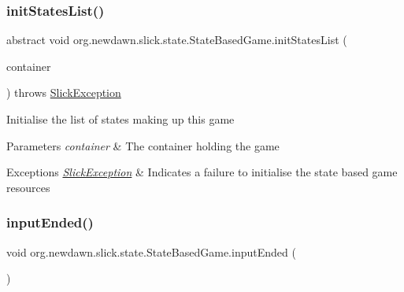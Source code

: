 \subsubsection{\texorpdfstring{init\+States\+List()}{initStatesList()}}
{\footnotesize\ttfamily abstract void org.\+newdawn.\+slick.\+state.\+State\+Based\+Game.\+init\+States\+List (\begin{DoxyParamCaption}\item[{\mbox{\hyperlink{classorg_1_1newdawn_1_1slick_1_1_game_container}{Game\+Container}}}]{container }\end{DoxyParamCaption}) throws \mbox{\hyperlink{classorg_1_1newdawn_1_1slick_1_1_slick_exception}{Slick\+Exception}}\hspace{0.3cm}{\ttfamily [abstract]}}

Initialise the list of states making up this game


\begin{DoxyParams}{Parameters}
{\em container} & The container holding the game \\
\hline
\end{DoxyParams}

\begin{DoxyExceptions}{Exceptions}
{\em \mbox{\hyperlink{classorg_1_1newdawn_1_1slick_1_1_slick_exception}{Slick\+Exception}}} & Indicates a failure to initialise the state based game resources \\
\hline
\end{DoxyExceptions}
\mbox{\label{classorg_1_1newdawn_1_1slick_1_1state_1_1_state_based_game_a299be9ff0a3a53cb265ff688c19e70e9}} 
\subsubsection{\texorpdfstring{input\+Ended()}{inputEnded()}}
{\footnotesize\ttfamily void org.\+newdawn.\+slick.\+state.\+State\+Based\+Game.\+input\+Ended (\begin{DoxyParamCaption}{ }\end{DoxyParamCaption})\hspace{0.3cm}{\ttfamily [inline]}}


